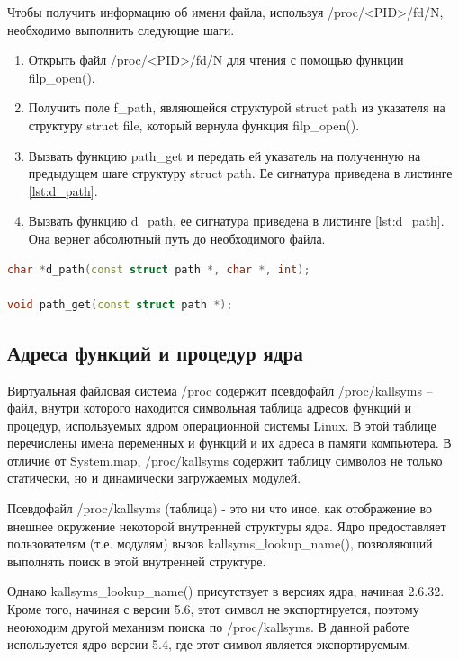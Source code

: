 \documentclass[a4paper,14pt]{article}
\begin{document}
Чтобы получить информацию об имени файла, используя /proc/<PID>/fd/N, необходимо выполнить следующие шаги.

\begin{enumerate}
	\item Открыть файл /proc/<PID>/fd/N для чтения с помощью функции filp\_open().
	\item Получить поле f\_path, являющейся структурой struct path из указателя на структуру struct file, который вернула функция filp\_open().
	\item Вызвать функцию path\_get и передать ей указатель на полученную на предыдущем шаге структуру struct path. Ее сигнатура приведена в листинге \ref{lst:d_path}.
	\item Вызвать функцию d\_path, ее сигнатура приведена в листинге \ref{lst:d_path}. Она вернет абсолютный путь до необходимого файла. 
\end{enumerate}

\begin{lstlisting}[language=C++,label={lst:d_path}, caption=\text{d\_path() и path\_get() для ядра версии 5.4.}]
char *d_path(const struct path *, char *, int);

void path_get(const struct path *);
\end{lstlisting}


\subsection{Адреса функций и процедур ядра}

Виртуальная файловая система /proc содержит псевдофайл /proc/kallsyms -- файл, внутри которого находится символьная таблица адресов функций и процедур, используемых ядром операционной системы Linux. В этой таблице перечислены имена переменных и функций и их адреса в памяти компьютера. В отличие от System.map, /proc/kallsyms содержит таблицу символов не только статически, но и динамически загружаемых модулей.

Псевдофайл /proc/kallsyms (таблица) - это ни что иное, как отображение во внешнее окружение некоторой внутренней структуры ядра. Ядро предоставляет пользователям (т.е. модулям) вызов kallsyms\_lookup\_name(), позволяющий выполнять поиск в этой внутренней структуре.

Однако kallsyms\_lookup\_name() присутствует в версиях ядра, начиная 2.6.32. Кроме того, начиная с версии 5.6, этот символ не экспортируется, поэтому неоюходим другой механизм поиска по /proc/kallsyms. В данной работе используется ядро версии 5.4, где этот символ является экспортируемым.
\end{document}
